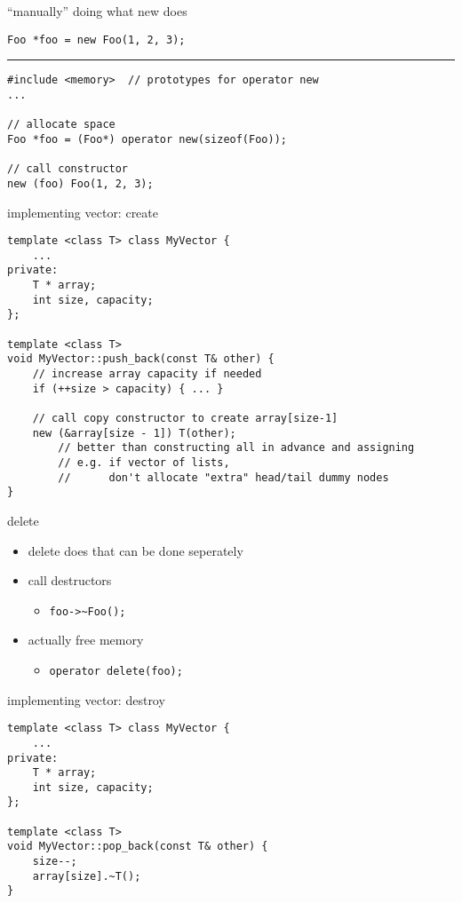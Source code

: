 \begin{frame}[fragile,label=placementNew]{``manually'' doing what new does}
\lstset{language=C++}
\begin{lstlisting}
Foo *foo = new Foo(1, 2, 3);
\end{lstlisting}
\hrule
\begin{lstlisting}
#include <memory>  // prototypes for operator new
...

// allocate space
Foo *foo = (Foo*) operator new(sizeof(Foo));

// call constructor
new (foo) Foo(1, 2, 3);
\end{lstlisting}
\end{frame}

\begin{frame}[fragile,label=placementNewVector]{implementing vector: create}
\lstset{language=C++,style=small}
\begin{lstlisting}
template <class T> class MyVector {
    ...
private:
    T * array;
    int size, capacity;
};

template <class T>
void MyVector::push_back(const T& other) {
    // increase array capacity if needed
    if (++size > capacity) { ... }

    // call copy constructor to create array[size-1]
    new (&array[size - 1]) T(other);
        // better than constructing all in advance and assigning
        // e.g. if vector of lists,
        //      don't allocate "extra" head/tail dummy nodes
}
\end{lstlisting}
\end{frame}

\begin{frame}[fragile,label=deleteParts]{delete}
\lstset{language=C++}
\begin{itemize}
    \item delete does  that can be done seperately
    \vspace{.5cm}
    \item call destructors
        \begin{itemize}
        \item \lstinline|foo->~Foo();|
        \end{itemize}
    \item actually free memory
        \begin{itemize}
        \item \lstinline|operator delete(foo);|
        \end{itemize}
\end{itemize}
\end{frame}

\begin{frame}[fragile,label=manualDeleteVector]{implementing vector: destroy}
\lstset{language=C++,style=small}
\begin{lstlisting}
template <class T> class MyVector {
    ...
private:
    T * array;
    int size, capacity;
};

template <class T>
void MyVector::pop_back(const T& other) {
    size--;
    array[size].~T();
}
\end{lstlisting}
\end{frame}

